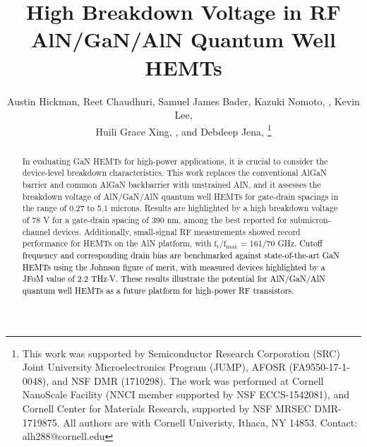 \documentclass[journal]{IEEEtran}
\newif\ifarxiv
\begin{document}
\title{High Breakdown Voltage in RF AlN/GaN/AlN Quantum Well HEMTs}

\author{Austin Hickman, Reet Chaudhuri, Samuel James Bader, Kazuki Nomoto, , Kevin Lee, \\ Huili Grace Xing, , and Debdeep Jena, %
\thanks{
  This work was supported by Semiconductor Research Corporation (SRC) Joint University Microelectronics Program (JUMP), AFOSR (FA9550-17-1-0048), and NSF DMR (1710298). The work was performed at Cornell NanoScale Facility (NNCI member supported by NSF ECCS-1542081), and Cornell Center for Materials Research, supported by NSF MRSEC DMR-1719875. All authors are with Cornell Univeristy, Ithaca, NY 14853. Contact: alh288@cornell.edu }}

\ifarxiv \else
{}%
{}
\fi
% 

\maketitle

\begin{abstract}
In evaluating GaN HEMTs for high-power applications, it is crucial to consider the device-level breakdown characteristics. This work replaces the conventional AlGaN barrier and common AlGaN backbarrier with unstrained AlN, and it assesses the breakdown voltage of AlN/GaN/AlN quantum well HEMTs for gate-drain spacings in the range of 0.27 to 5.1 microns. Results are highlighted by a high breakdown voltage of 78 V for a gate-drain spacing of 390 nm, among the best reported for submicron-channel devices. Additionally, small-signal RF measurements showed record performance for HEMTs on the AlN platform, with $\mathrm{f_t/f_{max}}$ = 161/70 GHz. \textcolor{black}{Cutoff frequency and corresponding drain bias are benchmarked against state-of-the-art GaN HEMTs using the Johnson figure of merit, with measured devices highlighted by a JFoM value of 2.2 THz$\cdot$V. These results illustrate the potential for AlN/GaN/AlN quantum well HEMTs as a future platform for high-power RF transistors.}
\end{abstract}
\end{document}
